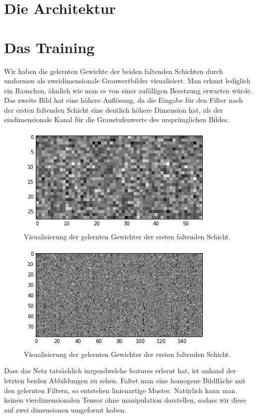 \documentclass[10pt,journal,compsoc]{IEEEtran}
\begin{document}
\section{Die Architektur}

\newpage
\section{Das Training}
 Wir haben die gelernten Gewichte der beiden faltenden Schichten durch umformen als zweidimensionale Grauwertbilder visualisiert. Man erknnt lediglich ein Rauschen, ähnlich wie man es von einer zufälligen Besetzung erwarten würde. Das zweite Bild hat eine höhere Auflösung, da die Eingabe für den Filter nach der ersten faltenden Schicht eine deutlich höhere Dimension hat, als der eindimensionale Kanal für die Graustufenwerte des ursprünglichen Bildes.
\begin{figure}[!h]
\centering
\includegraphics[scale=0.6]{learned_conv1_weights}
\caption{Visualisierung der gelernten Gewichter der ersten faltenden Schicht.}
\end{figure}
\begin{figure}[!h]
\centering
\includegraphics[scale=0.6]{learned_conv2_weights}
\caption{Visualisierung der gelernten Gewichter der ersten faltenden Schicht.}
\end{figure}

\noindent Dass das Netz tatsächlich inrgendwelche features erlernt hat, ist anhand der letzten beiden Abbildungen zu sehen. Faltet man eine homogene Bildfläche mit den gelernten Filtern, so entstehen linienartige Muster. Natürlich kann man keinen vierdimensionalen Tensor ohne manipulation darstellen, sodass wir diese auf zwei dimensionen umgeformt haben.
\end{document}

